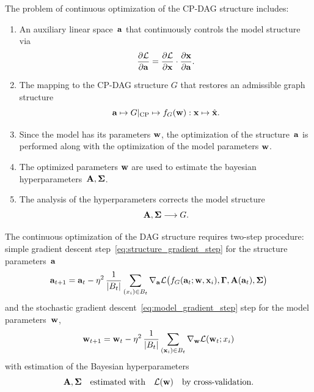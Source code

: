 \documentclass[12pt]{article}
\begin{document}
The problem of continuous optimization of the CP-DAG structure includes:
\begin{enumerate}
    \item An auxiliary linear space~$\mathbf{a}$ that continuously controls the model structure via
    \[
        \frac{\partial \mathcal{L}}{\partial \mathbf{a}} = \frac{\partial \mathcal{L}}{\partial {\mathbf{x}}} \cdot \frac{\partial {\mathbf{x}}}{\partial \mathbf{a}}.
    \]
    \item The mapping to the CP-DAG structure $G$ that restores an admissible graph structure
    \[
    \mathbf{a} \mapsto G|_\text{CP} \mapsto {f_{G}}(\mathbf{w}): \mathbf{x} \mapsto \hat{\mathbf{x}}.
    \]
    \item Since the model has its parameters $\mathbf{w}$,
    the optimization of the structure~$\mathbf{a}$ is performed
    along with the optimization of the model parameters $\mathbf{w}$.
    \item The optimized parameters $\mathbf{w}$ are used to estimate the bayesian hyperparameters~$\mathbf{A},{\boldsymbol{\Sigma}}$.
    \item The analysis of the hyperparameters corrects the model structure
    \[
        \mathbf{A}, {\boldsymbol{\Sigma}} \longrightarrow G.
    \]
\end{enumerate}

The continuous optimization of the DAG structure requires two-step procedure:
simple gradient descent step~\eqref{eq:structure_gradient_step} for the structure parameters~$\mathbf{a}$
\begin{equation}
    \mathbf{a}_{t+1} = \mathbf{a}_t - \eta^2 \, \frac{1}{|B_t|} \sum_{(x_i) \in B_t} \nabla_{\mathbf{a}} \mathcal{L}\bigl({f_{G}}(\mathbf{a}_t; \mathbf{w},\mathbf{x}_i), {\boldsymbol{\Gamma}},\mathbf{A}(\mathbf{a}_t), {\boldsymbol{\Sigma}}\bigr)
    \label{eq:structure_gradient_step}
\end{equation}
and the stochastic gradient descent~\eqref{eq:model_gradient_step} step for the model parameters~$\mathbf{w}$,
\begin{equation}
    \mathbf{w}_{t+1} = \mathbf{w}_t - \eta^2 \, \frac{1}{|B_t|} \sum_{(\mathbf{x}_i) \in B_t} \nabla_{\mathbf{w}} \mathcal{L}(\mathbf{w}_t; x_i)
    \label{eq:model_gradient_step}
\end{equation}
with estimation of the Bayesian hyperparameters
\begin{equation}
    \mathbf{A}, {\boldsymbol{\Sigma}} \quad\text{estimated with}\quad \mathcal{L}(\mathbf{w})\quad\text{by cross-validation}.
    \label{eq:hyperparameter_estimation}
\end{equation}
\end{document}
